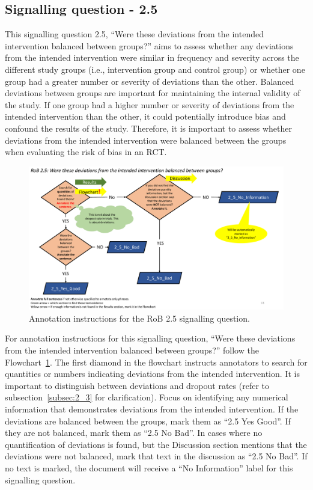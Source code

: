 \documentclass[sn-mathphys,Numbered]{sn-jnl}%
\begin{document}
\subsection*{Signalling question - 2.5 }
%
This signalling question 2.5, ``Were these deviations from the intended intervention balanced between groups?'' aims to assess whether any deviations from the intended intervention were similar in frequency and severity across the different study groups (i.e., intervention group and control group) or whether one group had a greater number or severity of deviations than the other.
Balanced deviations between groups are important for maintaining the internal validity of the study.
If one group had a higher number or severity of deviations from the intended intervention than the other, it could potentially introduce bias and confound the results of the study.
Therefore, it is important to assess whether deviations from the intended intervention were balanced between the groups when evaluating the risk of bias in an RCT.


%
%
%
\begin{figure}[hbt]
    \centering
    \includegraphics[width=\textwidth]{figures/2_5.pdf}
    \caption{Annotation instructions for the RoB 2.5 signalling question.}
    \label{fig:2_5}
\end{figure}
%
%
%


For annotation instructions for this signalling question, ``Were these deviations from the intended intervention balanced between groups?'' follow the Flowchart~\ref{fig:2_5}.
The first diamond in the flowchart instructs annotators to search for quantities or numbers indicating deviations from the intended intervention.
It is important to distinguish between deviations and dropout rates (refer to subsection~\ref{subsec:2_3} for clarification).
Focus on identifying any numerical information that demonstrates deviations from the intended intervention.
If the deviations are balanced between the groups, mark them as ``2.5 Yes Good''.
If they are not balanced, mark them as ``2.5 No Bad''.
In cases where no quantification of deviations is found, but the Discussion section mentions that the deviations were not balanced, mark that text in the discussion as ``2.5 No Bad''.
If no text is marked, the document will receive a ``No Information'' label for this signalling question.
%
%
%
\end{document}
